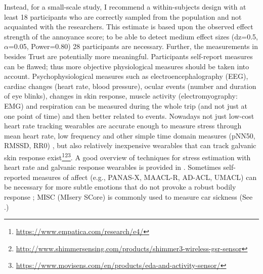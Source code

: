 Instead, for a small-scale study, I recommend a within-subjects design with at least 18 participants who are correctly sampled from the population and not acquainted with the researchers. This estimate is based upon the observed effect strength of the annoyance score; to be able to detect medium effect sizes (dz=0.5, \(\alpha\)=0.05, Power=0.80) 28 participants are necessary. Further, the measurements in  besides Trust are potentially more meaningful. Participants self-report measures can be flawed; thus more objective physiological measures should be taken into account.  Psychophysiological measures such as electroencephalography (EEG), cardiac changes (heart rate, blood pressure), ocular events (number and duration of eye blinks), changes in skin response, muscle activity (electromyography: EMG) and respiration \cite{Tichon2014PhysiologicalTraining} can be measured during the whole trip (and not just at one point of time) and then better related to events. Nowadays not just low-cost heart rate tracking wearables are accurate enough to measure stress through mean heart rate, low frequency and other simple time domain measures (pNN50, RMSSD, RR0) \cite{Salai2016}, but also relatively inexpensive wearables that can track galvanic skin response exist\footnote{\url{https://www.empatica.com/research/e4/}}\fnsep\footnote{\url{http://www.shimmersensing.com/products/shimmer3-wireless-gsr-sensor}}\fnsep\footnote{\url{https://www.movisens.com/en/products/eda-and-activity-sensor/}}. A good overview of techniques for stress estimation with heart rate and galvanic response wearables is provided in \cite{Ollander2015WearableEstimation}. Sometimes self-reported measures of affect (e.g., PANAS-X, MAACL-R, AD-ACL, UMACL) can be necessary for more subtle emotions that do not provoke a robust bodily response \cite{Boyle2015MeasuresDimensions}; MISC (MIsery SCore) is commonly used to measure car sickness (See .) %

